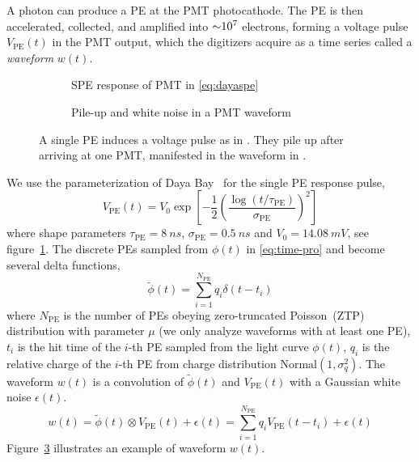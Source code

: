 A photon can produce a PE at the PMT photocathode. The PE is then accelerated, collected, and amplified into $\num[retain-unity-mantissa=false]{\sim 1e7}$ electrons, forming a voltage pulse $V_\mathrm{PE}(t)$ in the PMT output, which the digitizers acquire as a time series called a \textit{waveform} $w(t)$. 

\begin{figure}[H]
  \begin{subfigure}{.49\textwidth}
    \centering
    \resizebox{\textwidth}{!}{}
    \caption{\label{fig:spe} SPE response of PMT in \eqref{eq:dayaspe}}
  \end{subfigure}
  \begin{subfigure}{.49\textwidth}
    \centering
    \resizebox{\textwidth}{!}{}
    \caption{\label{fig:pile} Pile-up and white noise in a PMT waveform}
  \end{subfigure}
  \caption{A single PE induces a voltage pulse as in . They pile up after arriving at one PMT, manifested in the waveform in .}
\end{figure}

We use the parameterization of Daya Bay~\cite{jetter_pmt_2012} for the single PE response pulse,
\begin{equation}
  V_\mathrm{PE}(t) = V_{0}\exp\left[-\frac{1}{2}\left(\frac{\log(t/\tau_\mathrm{PE})}{\sigma_\mathrm{PE}}\right)^{2}\right]
  \label{eq:dayaspe}
\end{equation}
where shape parameters $\tau_\mathrm{PE}=\SI{8}{ns}$, $\sigma_\mathrm{PE}=\SI{0.5}{ns}$ and $V_{0}=\SI{14.08}{mV}$, see figure~\ref{fig:spe}. The discrete PEs sampled from $\phi(t)$ in \eqref{eq:time-pro} and become several delta functions, 
\begin{equation}
  \label{eq:lc-sample}
  \tilde{\phi}(t) = \sum_{i=1}^{N_{\mathrm{PE}}} q_i \delta(t-t_i)
\end{equation}
where $N_\mathrm{PE}$ is the number of PEs obeying zero-truncated Poisson~(ZTP) distribution with parameter $\mu$ (we only analyze waveforms with at least one PE), $t_i$ is the hit time of the $i$-th PE sampled from the light curve $\phi(t)$, $q_i$ is the relative charge of the $i$-th PE from charge distribution $\mathrm{Normal}(1,\sigma_{q}^2)$. The waveform $w(t)$ is a convolution of $\tilde{\phi}(t)$ and $V_\mathrm{PE}(t)$ with a Gaussian white noise $\epsilon(t)$.
\begin{equation}
  \label{eq:1}
  w(t) = \tilde{\phi}(t) \otimes V_\mathrm{PE}(t) + \epsilon(t) = \sum_{i=1}^{N_\mathrm{PE}} q_i V_\mathrm{PE}(t-t_i) + \epsilon(t)
\end{equation}
Figure~\ref{fig:pile} illustrates an example of waveform $w(t)$. 

